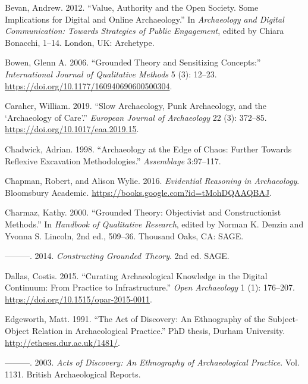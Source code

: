 \documentclass[
]{article}
\newlength{\cslhangindent}
\newenvironment{CSLReferences}[2] %
 {\begin{list}{}{%
  \setlength{\itemindent}{0pt}
  \setlength{\leftmargin}{0pt}
  \setlength{\parsep}{0pt}
  \ifodd #1
   \setlength{\leftmargin}{\cslhangindent}
   \setlength{\itemindent}{-1\cslhangindent}
  \fi
  \setlength{\itemsep}{#2\baselineskip}}}
 {\end{list}}
\begin{document}
\begin{CSLReferences}{1}{0}
Bevan, Andrew. 2012. {``Value, {Authority} and the {Open Society}. {Some
Implications} for {Digital} and {Online Archaeology}.''} In
\emph{Archaeology and {Digital Communication}: {Towards Strategies} of
{Public Engagement}}, edited by Chiara Bonacchi, 1--14. London, UK:
Archetype.

Bowen, Glenn A. 2006. {``Grounded {Theory} and {Sensitizing
Concepts}:''} \emph{International Journal of Qualitative Methods} 5 (3):
12--23. \url{https://doi.org/10.1177/160940690600500304}.

Caraher, William. 2019. {``Slow {Archaeology}, {Punk Archaeology}, and
the {`{Archaeology} of {Care}'}.''} \emph{European Journal of
Archaeology} 22 (3): 372--85. \url{https://doi.org/10.1017/eaa.2019.15}.

Chadwick, Adrian. 1998. {``Archaeology at the Edge of Chaos: Further
Towards Reflexive Excavation Methodologies.''} \emph{Assemblage}
3:97--117.

Chapman, Robert, and Alison Wylie. 2016. \emph{Evidential {Reasoning} in
{Archaeology}}. Bloomsbury Academic.
\url{https://books.google.com?id=tMohDQAAQBAJ}.

Charmaz, Kathy. 2000. {``Grounded {Theory}: {Objectivist} and
{Constructionist Methods}.''} In \emph{Handbook of {Qualitative
Research}}, edited by Norman K. Denzin and Yvonna S. Lincoln, 2nd ed.,
509--36. Thousand Oaks, CA: SAGE.

---------. 2014. \emph{Constructing {Grounded Theory}}. 2nd ed. SAGE.

Dallas, Costis. 2015. {``Curating {Archaeological Knowledge} in the
{Digital Continuum}: {From Practice} to {Infrastructure}.''} \emph{Open
Archaeology} 1 (1): 176--207.
\url{https://doi.org/10.1515/opar-2015-0011}.

Edgeworth, Matt. 1991. {``The Act of Discovery: {An} Ethnography of the
Subject-Object Relation in Archaeological Practice.''} PhD thesis,
Durham University. \url{http://etheses.dur.ac.uk/1481/}.

---------. 2003. \emph{Acts of Discovery: {An} Ethnography of
Archaeological Practice}. Vol. 1131. British Archaeological Reports.


\end{CSLReferences}
\end{document}
